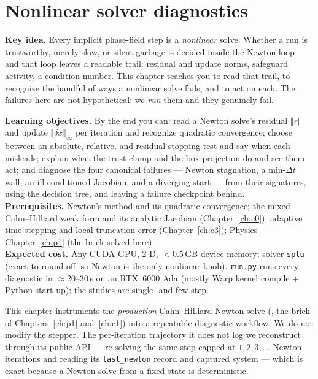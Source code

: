 \chapter{Nonlinear solver diagnostics}
\label{ch:c6}
\begin{keybox}
\textbf{Key idea.} Every implicit phase-field step is a \emph{nonlinear}
solve. Whether a run is trustworthy, merely slow, or silent garbage is
decided inside the Newton loop --- and that loop leaves a readable trail:
residual and update norms, safeguard activity, a condition number. This
chapter teaches you to read that trail, to recognize the handful of ways a
nonlinear solve fails, and to act on each. The failures here are not
hypothetical: we \emph{run} them and they genuinely fail.
\end{keybox}

\begin{keybox}
\textbf{Learning objectives.} By the end you can: read a Newton solve's
residual $\Vert r\Vert$ and update $\Vert\delta x\Vert_\infty$ per iteration
and recognize quadratic convergence; choose between an absolute, relative, and
residual stopping test and say when each misleads; explain what the trust
clamp and the box projection do and see them act; and diagnose the four
canonical failures --- Newton stagnation, a min-$\Delta t$ wall, an
ill-conditioned Jacobian, and a diverging start --- from their signatures,
using the decision tree, and leaving a failure checkpoint behind.\\[2pt]
\textbf{Prerequisites.} Newton's method and its quadratic convergence; the
mixed Cahn--Hilliard weak form and its analytic Jacobian
(Chapter~\ref{ch:c0}); adaptive time stepping and local truncation error
(Chapter~\ref{ch:c3}); Physics Chapter~\ref{ch:p1} (the brick solved here).
\\[2pt]
\textbf{Expected cost.} Any CUDA GPU, 2-D, $<0.5$\,GB device memory; solver
\texttt{splu} (exact to round-off, so Newton is the only nonlinear knob).
\texttt{run.py} runs every diagnostic in $\approx$20--30\,s on an RTX~6000 Ada
(mostly Warp kernel compile + Python start-up); the studies are single- and
few-step.
\end{keybox}

This chapter instruments the \emph{production} Cahn--Hilliard Newton solve
(, the brick of
Chapters~\ref{ch:p1} and~\ref{ch:c1}) into a repeatable diagnostic workflow.
We do not modify the stepper. The per-iteration trajectory it does not log we
reconstruct through its public API --- re-solving the same step capped at
$1,2,3,\dots$ Newton iterations and reading its \texttt{last\_newton} record
and captured system --- which is exact because a Newton solve from a fixed
state is deterministic.

